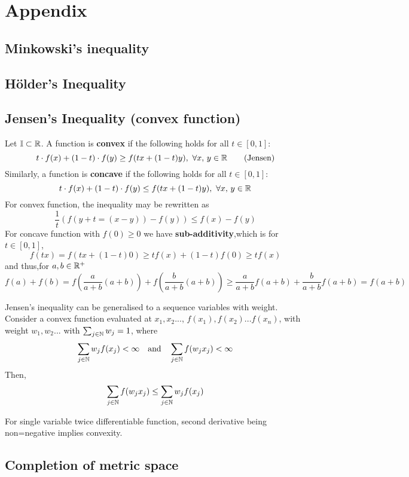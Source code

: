 \newpage
\section{Appendix}
\subsection{Minkowski's inequality}\label{Minkowski-holder}
\subsection{Hölder's Inequality}\label{Hölder's inequality}
\subsection{Jensen's Inequality (convex function)}\label{Jensen's inquality}
Let $\mathbb{I}\subset \mathbb{R}$. A function  is {\bf convex} if the following holds for all $t\in[0,1]$:
$$
	t\cdot f(x)+(1-t)\cdot f(y)\geq f(tx+(1-t)y),\,\,\forall x,\,y\in \mathbb{R}\quad\quad\text{(Jensen)}
$$
Similarly,  a function  is {\bf concave} if the following holds for all $t\in[0,1]$:
$$
	t\cdot f(x)+(1-t)\cdot f(y)\leq f(tx+(1-t)y),\,\,\forall x,\,y\in \mathbb{R}
$$
For convex function, the inequality may be rewritten as
$$
	\frac{1}{t}(f(y+t
	=(x-y))-f(y))\leq f(x)-f(y)
$$
For concave function with $f(0)\geq 0$ we have {\bf sub-additivity},which is for $t\in[0,1]$,
$$
	f(tx)=f(tx+(1-t)0)\geq tf(x)+(1-t)f(0)\geq tf(x)
$$
and thus,for $a,b\in\mathbb{R}^+$
$$
	f(a)+f(b)=f(\frac{a}{a+b}(a+b))+f(\frac{b}{a+b}(a+b))\geq \frac{a}{a+b}f(a+b)+\frac{b}{a+b}f(a+b)=f(a+b)
$$

\begin{remark}\rm\nextline
	Jensen's inequality can be generalised to a sequence variables with weight. Consider a convex function evaluated at $x_1,x_2...$, $f(x_1),f(x_2)...f(x_n)$, with weight $w_1,w_2...$ with $\sum_{j\in\mathbb{N}}w_j=1$, where
	$$
		\sum_{j\in\mathbb{N}}w_j f(x_j)<\infty \quad\text{and}\quad
		\sum_{j\in\mathbb{N}} f(w_jx_j)<\infty
	$$
	Then,
	$$
		\sum_{j\in\mathbb{N}} f(w_jx_j)\leq\sum_{j\in\mathbb{N}}w_j f(x_j)
	$$
\end{remark}

\begin{remark}[$f''>0$]\rm\nextline
	For single variable twice differentiable function, second derivative being non=negative implies convexity.
\end{remark}

\subsection{Completion of metric space}\label{completion of metric space}


